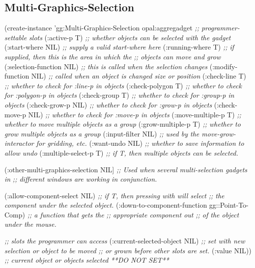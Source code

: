 \begin{group}
\section{Multi-Graphics-Selection}
\label{multi-gs}

\begin{programexample}
(create-instance 'gg:Multi-Graphics-Selection opal:aggregadget
  {\it ;; programmer-settable slots}
   (:active-p T)      {\it ;; whether objects can be selected with the gadget}
   (:start-where NIL) {\it ;; supply a valid start-where here}
   (:running-where T) {\it ;; if supplied, then this is the area in which the}
	              {\it ;; objects can move and grow}
   (:selection-function NIL) {\it ;; this is called when the selection changes}
   (:modify-function NIL) {\it ;; called when an object is changed size or position}
   (:check-line T)        {\it ;; whether to check for :line-p in objects}
   (:check-polygon T)     {\it ;; whether to check for :polygon-p in objects}
   (:check-group T)       {\it ;; whether to check for :group-p in objects}
   (:check-grow-p NIL)    {\it ;; whether to check for :grow-p in objects}
   (:check-move-p NIL)    {\it ;; whether to check for :move-p in objects}
   (:move-multiple-p T)   {\it ;; whether to move multiple objects as a group}
   (:grow-multiple-p T)   {\it ;; whether to grow multiple objects as a group}
   (:input-filter NIL)    {\it ;; used by the move-grow-interactor for gridding, etc.}
   (:want-undo NIL)       {\it ;; whether to save information to allow undo}
   (:multiple-select-p T) {\it ;; if T, then multiple objects can be selected.}

   (:other-multi-graphics-selection NIL]  {\it ;; Used when several multi-selection gadgets in}
                                          {\it ;; different windows are working in conjunction.}

   (:allow-component-select NIL)      {\it ;; if T, then pressing with  will select}
                                      {\it ;; the component under the selected object.}
   (:down-to-component-function gg::Point-To-Comp)  {\it ;; a function that gets the}
                                                    {\it ;; appropriate component out}
                                                    {\it ;; of the object under the mouse.}

  {\it ;; slots the programmer can access}
   (:current-selected-object NIL) {\it ;; set with new selection or object to be moved}
				  {\it ;; or grown before other slots are set.}
   (:value NIL))  {\it ;; current object or objects selected **DO NOT SET**}
\end{programexample}
\end{group}

